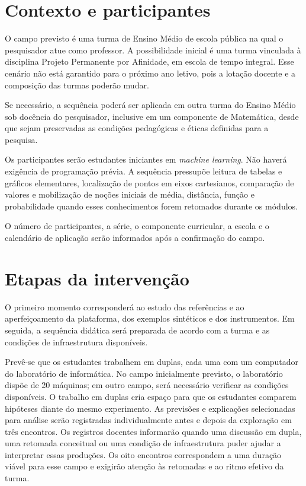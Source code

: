\section{Contexto e participantes}

O campo previsto é uma turma de Ensino Médio de escola pública na qual o pesquisador atue como professor. A possibilidade inicial é uma turma vinculada à disciplina Projeto Permanente por Afinidade, em escola de tempo integral. Esse cenário não está garantido para o próximo ano letivo, pois a lotação docente e a composição das turmas poderão mudar.

Se necessário, a sequência poderá ser aplicada em outra turma do Ensino Médio sob docência do pesquisador, inclusive em um componente de Matemática, desde que sejam preservadas as condições pedagógicas e éticas definidas para a pesquisa.

Os participantes serão estudantes iniciantes em \textit{machine learning}. Não haverá exigência de programação prévia. A sequência pressupõe leitura de tabelas e gráficos elementares, localização de pontos em eixos cartesianos, comparação de valores e mobilização de noções iniciais de média, distância, função e probabilidade quando esses conhecimentos forem retomados durante os módulos.

O número de participantes, a série, o componente curricular, a escola e o calendário de aplicação serão informados após a confirmação do campo.

\section{Etapas da intervenção}

O primeiro momento corresponderá ao estudo das referências e ao aperfeiçoamento da plataforma, dos exemplos sintéticos e dos instrumentos. Em seguida, a sequência didática será preparada de acordo com a turma e as condições de infraestrutura disponíveis.

Prevê-se que os estudantes trabalhem em duplas, cada uma com um computador do laboratório de informática. No campo inicialmente previsto, o laboratório dispõe de 20 máquinas; em outro campo, será necessário verificar as condições disponíveis. O trabalho em duplas cria espaço para que os estudantes comparem hipóteses diante do mesmo experimento. As previsões e explicações selecionadas para análise serão registradas individualmente antes e depois da exploração em três encontros. Os registros docentes informarão quando uma discussão em dupla, uma retomada conceitual ou uma condição de infraestrutura puder ajudar a interpretar essas produções. Os oito encontros correspondem a uma duração viável para esse campo e exigirão atenção às retomadas e ao ritmo efetivo da turma.

